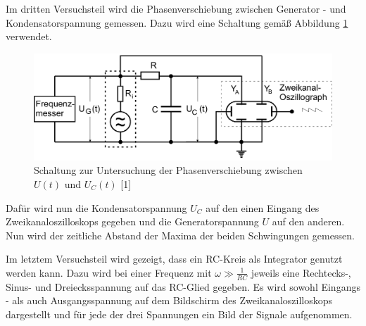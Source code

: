 Im dritten Versuchsteil wird die Phasenverschiebung zwischen Generator - und 
Kondensatorspannung gemessen. Dazu wird eine Schaltung gemäß Abbildung \ref{fig:aufbau3}
verwendet. 

\begin{figure}
\centering
\includegraphics[scale=0.2]{content/aufbau3.png}
\caption{Schaltung zur Untersuchung der Phasenverschiebung zwischen $U(t)$ und $U_C(t)$ [1]}
\label{fig:aufbau3}
\end{figure}

Dafür wird nun die Kondensatorspannung $U_C$ auf den einen Eingang des 
Zweikanaloszilloskops gegeben und die Generatorspannung $U$ auf den anderen. 
Nun wird der zeitliche Abstand der Maxima der beiden Schwingungen gemessen. 

Im letztem Versuchsteil wird gezeigt, dass ein RC-Kreis als Integrator 
genutzt werden kann. Dazu wird bei einer Frequenz mit $\omega \gg \frac{1}{RC}$ 
jeweils eine Rechtecks-, Sinus- und Dreiecksspannung auf das RC-Glied gegeben. 
Es wird sowohl Eingangs - als auch Ausgangsspannung auf dem Bildschirm des 
Zweikanaloszilloskops dargestellt und für jede der drei Spannungen ein Bild der 
Signale aufgenommen. 



